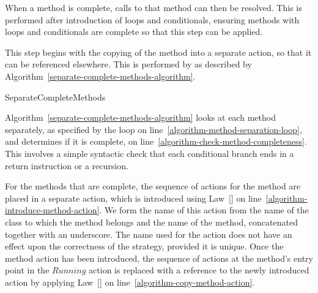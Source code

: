 When a method is complete, calls to that method can then be resolved.
This is performed after introduction of loops and conditionals,
ensuring methods with loops and conditionals are complete so that this
step can be applied.

This step begins with the copying of the method into a separate
action, so that it can be referenced elsewhere.
This is performed by as described by
Algorithm~\ref{separate-complete-methods-algorithm}.
\begin{algorithm}
  \begin{algorithmic}[1]
     \label{algorithm-method-separation-loop}
     \label{algorithm-check-method-completeness}
    \State {} \label{algorithm-introduce-method-action}
    \State {} \label{algorithm-copy-method-action}
    \EndIf
    \EndFor
  \end{algorithmic}
  \caption{SeparateCompleteMethods}
  \label{separate-complete-methods-algorithm}
\end{algorithm}

Algorithm~\ref{separate-complete-methods-algorithm} looks at each
method separately, as specified by the loop on
line~\ref{algorithm-method-separation-loop}, and determines if it is
complete, on line~\ref{algorithm-check-method-completeness}.
This involves a simple syntactic check that each conditional branch
ends in a return instruction or a recursion.


For the methods that are complete, the sequence of actions for the
method are placed in a separate action, which is introduced using
Law~[] on
line~\ref{algorithm-introduce-method-action}.
We form the name of this action from the name of the class to which
the method belongs and the name of the method, concatenated together
with an underscore.
The name used for the action does not have an effect upon the
correctness of the strategy, provided it is unique.
Once the method action has been introduced, the sequence of actions at
the method's entry point in the $Running$ action is replaced with a
reference to the newly introduced action by applying
Law~[] on
line~\ref{algorithm-copy-method-action}.


